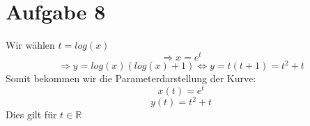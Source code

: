 \section{Aufgabe 8}
Wir wählen $t = log(x)$
$$\Rightarrow x = e^t$$
$$\Rightarrow y = log(x)(log(x)+1) \Leftrightarrow y = t(t+1) = t^2 + t $$
Somit bekommen wir die Parameterdarstellung der Kurve:
$$x(t) = e^t$$
$$y(t) = t^2 + t$$
Dies gilt für $t \in \mathbb{R}$